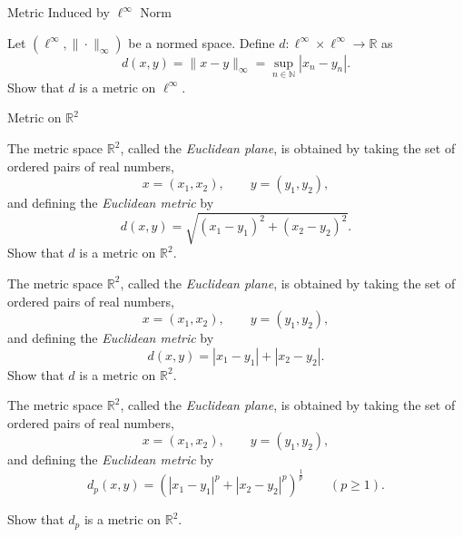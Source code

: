\documentclass[12pt, a4paper]{article}
\begin{document}
\begin{heading}
    Metric Induced by $\ell^\infty$ Norm
\end{heading}

\vspace{10pt}

\begin{theorem}
    Let $(\ell^\infty,\|\cdot\|_\infty)$ be a normed space. Define $d:\ell^\infty\times \ell^\infty\to\mathbb{R}$ as
    \[
        d(x,y)=\|x-y\|_\infty=\sup_{n\in\mathbb{N}}|x_n-y_n|.
    \]
    Show that $d$ is a metric on $\ell^\infty$.
\end{theorem}

\clearpage

\begin{heading}
    Metric on $\mathbb{R}^2$
\end{heading}

\vspace{10pt}

\begin{theorem}
    The metric space $\mathbb{R}^2$, called the \emph{Euclidean plane}, is obtained by
    taking the set of ordered pairs of real numbers,
    \[
    x=(x_1,x_2), \qquad y=(y_1,y_2),
    \]
    and defining the \emph{Euclidean metric} by
    \[
    d(x,y)=\sqrt{(x_1-y_1)^2+(x_2-y_2)^2}.
    \]
    Show that $d$ is a metric on $\mathbb{R}^2$.
\end{theorem}

\clearpage

\begin{theorem}
    The metric space $\mathbb{R}^2$, called the \emph{Euclidean plane}, is obtained by
    taking the set of ordered pairs of real numbers,
    \[
    x=(x_1,x_2), \qquad y=(y_1,y_2),
    \]
    and defining the \emph{Euclidean metric} by
    \[
    d(x,y)=|x_1-y_1|+|x_2-y_2|.
    \]
    Show that $d$ is a metric on $\mathbb{R}^2$.
\end{theorem}

\clearpage

\begin{theorem}
    The metric space $\mathbb{R}^2$, called the \emph{Euclidean plane}, is obtained by
    taking the set of ordered pairs of real numbers,
    \[
    x=(x_1,x_2), \qquad y=(y_1,y_2),
    \]
    and defining the \emph{Euclidean metric} by
    \[
    d_p(x,y)=\left(|x_1-y_1|^p+|x_2-y_2|^p\right)^{\frac{1}{p}} \qquad (p\ge 1).
    \]

    Show that $d_p$ is a metric on $\mathbb{R}^2$.
\end{theorem}
\end{document}
